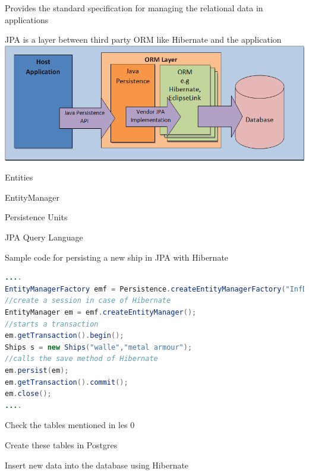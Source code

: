 \documentclass{beamer}
\begin{document}
\begin{slide}{
\item Provides the standard specification for managing the relational data in applications
\item JPA is a layer between third party ORM like Hibernate and the application 
\\
\includegraphics[scale=0.3]{img/JPA.png}
}
\end{slide} 
 

\begin{slide}{
\item Entities
\item EntityManager
\item Persistence Units
\item JPA Query Language
}
\end{slide}  

\begin{frame}[fragile]
Sample code for persisting a new ship in JPA with Hibernate 
\begin{lstlisting}[language=java]
....	 
EntityManagerFactory emf = Persistence.createEntityManagerFactory("InfDev5PU");
//create a session in case of Hibernate
EntityManager em = emf.createEntityManager();
//starts a transaction 
em.getTransaction().begin();
Ships s = new Ships("walle","metal armour");
//calls the save method of Hibernate
em.persist(em);
em.getTransaction().commit();
em.close();
....
\end{lstlisting} 
\end{frame} 
 

\begin{slide}{
\item Check the tables mentioned in les 0
\item Create these tables in Postgres
\item Insert new data into the database using Hibernate	
	}
\end{slide}
\end{document}
